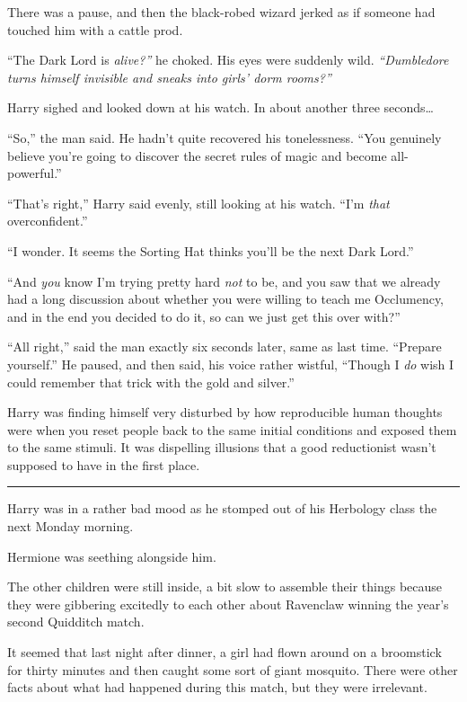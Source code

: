 There was a pause, and then the black-robed wizard jerked as if someone
had touched him with a cattle prod.

``The Dark Lord is \emph{alive?''} he choked. His eyes were suddenly
wild. \emph{``Dumbledore turns himself invisible and sneaks into girls'
dorm rooms?''}

Harry sighed and looked down at his watch. In about another three
seconds\ldots{}

``So,'' the man said. He hadn't quite recovered his tonelessness. ``You
genuinely believe you're going to discover the secret rules of magic and
become all-powerful.''

``That's right,'' Harry said evenly, still looking at his watch. ``I'm
\emph{that} overconfident.''

``I wonder. It seems the Sorting Hat thinks you'll be the next Dark
Lord.''

``And \emph{you} know I'm trying pretty hard \emph{not} to be, and you
saw that we already had a long discussion about whether you were willing
to teach me Occlumency, and in the end you decided to do it, so can we
just get this over with?''

``All right,'' said the man exactly six seconds later, same as last
time. ``Prepare yourself.'' He paused, and then said, his voice rather
wistful, ``Though I \emph{do} wish I could remember that trick with the
gold and silver.''

Harry was finding himself very disturbed by how reproducible human
thoughts were when you reset people back to the same initial conditions
and exposed them to the same stimuli. It was dispelling illusions that a
good reductionist wasn't supposed to have in the first place.

\begin{center}\rule{3in}{0.4pt}\end{center}

Harry was in a rather bad mood as he stomped out of his Herbology class
the next Monday morning.

Hermione was seething alongside him.

The other children were still inside, a bit slow to assemble their
things because they were gibbering excitedly to each other about
Ravenclaw winning the year's second Quidditch match.

It seemed that last night after dinner, a girl had flown around on a
broomstick for thirty minutes and then caught some sort of giant
mosquito. There were other facts about what had happened during this
match, but they were irrelevant.

